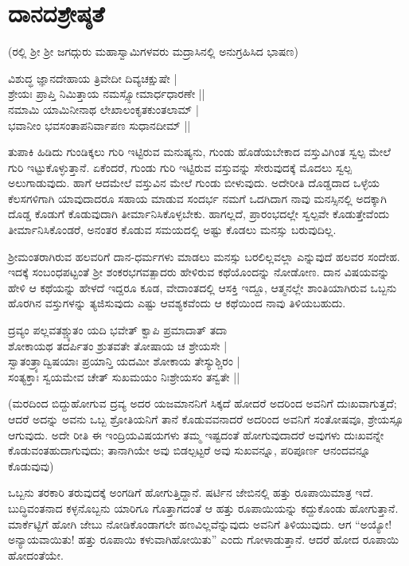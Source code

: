 \chapter{ದಾನದಶ್ರೇಷ್ಠತೆ}\label{chap14}

({}ರಲ್ಲಿ ಶ್ರೀ ಶ್ರೀ ಜಗದ್ಗುರು ಮಹಾಸ್ವಾಮಿಗಳವರು ಮದ್ರಾಸಿನಲ್ಲಿ ಅನುಗ್ರಹಿಸಿದ ಭಾಷಣ)

\begin{shloka}
ವಿಶುದ್ಧ ಜ್ಞಾನದೇಹಾಯ ತ್ರಿವೇದೀ ದಿವ್ಯಚಕ್ಷುಷೇ |\\
ಶ್ರೇಯಃ ಪ್ರಾಪ್ತಿ ನಿಮಿತ್ತಾಯ ನಮಸ್ಸ್ಸೋಮಾರ್ಧಧಾರಣೇ ||\\
ನಮಾಮಿ ಯಾಮಿನೀನಾಥ ಲೇಖಾಲಂಕೃತಕುಂತಲಾಮ್ |\\
ಭವಾನೀಂ ಭವಸಂತಾಪನಿರ್ವಾಪಣ ಸುಧಾನದೀಮ್ ||
\end{shloka}

ತುಪಾಕಿ ಹಿಡಿದು ಗುಂಡಿಕ್ಕಲು ಗುರಿ ಇಟ್ಟಿರುವ ಮನುಷ್ಯನು, ಗುಂಡು ಹೊಡೆಯಬೇಕಾದ ವಸ್ತುವಿಗಿಂತ ಸ್ವಲ್ಪ ಮೇಲೆ ಗುರಿ ಇಟ್ಟುಕೊಳ್ಳುತ್ತಾನೆ. ಏಕೆಂದರೆ, ಗುಂಡು ಗುರಿ ಇಟ್ಟಿರುವ ವಸ್ತುವನ್ನು ಸೇರುವುದಕ್ಕೆ ಮೊದಲು ಸ್ವಲ್ಪ ಅಲುಗಾಡುವುದು. ಹಾಗೆ ಆದಮೇಲೆ ವಸ್ತುವಿನ ಮೇಲೆ ಗುಂಡು ಬೀಳುವುದು. ಅದೇರೀತಿ ದೊಡ್ಡದಾದ ಒಳ್ಳೆಯ ಕೆಲಸಗಳಿಗಾಗಿ ಯಾವುದಾದರೂ ಸಹಾಯ ಮಾಡುವ ಸಂದರ್ಭ ನಮಗೆ ಒದಗಿದಾಗ ನಾವು ಮನಸ್ಸಿನಲ್ಲಿ ಅದಕ್ಕಾಗಿ ದೊಡ್ಡ ಕೊಡುಗೆ ಕೊಡುವುದಾಗಿ ತೀರ್ಮಾನಿಸಿಕೊಳ್ಳಬೇಕು. ಹಾಗಲ್ಲದೆ, ಪ್ರಾರಂಭದಲ್ಲೇ ಸ್ವಲ್ಪವೇ ಕೊಡುತ್ತೇವೆಂದು ತೀರ್ಮಾನಿಸಿಕೊಂಡರೆ, ಅನಂತರ ಕೊಡುವ ಸಮಯದಲ್ಲಿ ಅಷ್ಟು ಕೊಡಲು ಮನಸ್ಸು ಬರುವುದಿಲ್ಲ.

ಶ್ರೀಮಂತರಾಗಿರುವ ಹಲವರಿಗೆ ದಾನ-ಧರ್ಮಗಳು ಮಾಡಲು ಮನಸ್ಸು ಬರಲಿಲ್ಲವಲ್ಲಾ ಎನ್ನುವುದೆ ಹಲವರ ಸಂದೇಹ. ಇದಕ್ಕೆ ಸಂಬಂಧಪಟ್ಟಂತೆ ಶ್ರೀ ಶಂಕರಭಗವತ್ಪಾದರು ಹೇಳಿರುವ ಕಥೆಯೊಂದನ್ನು ನೋಡೋಣ. ದಾನ ವಿಷಯವನ್ನು ಹೇಳಿ ಆ ಕಥೆಯನ್ನು ಹೇಳದೆ ಇದ್ದರೂ ಕೂಡ, ವೇದಾಂತದಲ್ಲಿ ಆಸಕ್ತಿ ಇದ್ದೂ, ಆತ್ಮನಲ್ಲೇ ಶಾಂತಿಯಾಗಿರುವ ಒಬ್ಬನು ಹೊರಗಿನ ವಸ್ತುಗಳನ್ನು ತ್ಯಜಿಸುವುದು ಎಷ್ಟು ಆವಶ್ಯಕವೆಂದು ಆ ಕಥೆಯಿಂದ ನಾವು ತಿಳಿಯಬಹುದು.

\begin{shloka}
ದ್ರವ್ಯಂ ಪಲ್ಲವತಶ್ಚ್ಯುತಂ ಯದಿ ಭವೇತ್ ಕ್ವಾಪಿ ಪ್ರಮಾದಾತ್ ತದಾ\\
ಶೋಕಾಯಥ ತದರ್ಪಿತಂ ಶ್ರುತವತೇ ತೋಷಾಯ ಚ ಶ್ರೇಯಸೇ |\\
ಸ್ವಾತಂತ್ರ್ಯಾದ್ವಿಷಯಾಃ ಪ್ರಯಾನ್ತಿ ಯದಮೀ ಶೋಕಾಯ ತೇಸ್ಯುಶ್ಚಿರಂ |\\
ಸಂತ್ಯಕ್ತಾಃ ಸ್ವಯಮೇವ ಚೇತ್ ಸುಖಮಯಂ ನಿಃಶ್ರೇಯಸಂ ತನ್ವತೇ ||
\end{shloka}

(ಮರದಿಂದ ಬಿದ್ದುಹೋಗುವ ದ್ರವ್ಯ ಅದರ ಯಜಮಾನನಿಗೆ ಸಿಕ್ಕದೆ ಹೋದರೆ ಅದರಿಂದ ಅವನಿಗೆ ದುಃಖವಾಗುತ್ತದೆ; ಆದರೆ ಅದನ್ನು ಅವನು ಒಬ್ಬ ಶ್ರೋತಿಯನಿಗೆ ತಾನೆ ಕೊಡುವವನಾದರೆ ಅದರಿಂದ ಅವನಿಗೆ ಸಂತೋಷವೂ, ಶ್ರೇಯಸ್ಸೂ ಆಗುವುದು. ಅದೇ ರೀತಿ ಈ ಇಂದ್ರಿಯವಿಷಯಗಳು ತಮ್ಮ ಇಷ್ಟದಂತೆ ಹೋಗುವುದಾದರೆ ಅವುಗಳು ದುಃಖವನ್ನೇ ಕೊಡುವಂತಹುದಾಗುವುದು; ತಾನಾಗಿಯೇ ಅವು ಬಿಡಲ್ಪಟ್ಟರೆ ಅವು ಸುಖವನ್ನೂ, ಪರಿಪೂರ್ಣ ಆನಂದವನ್ನೂ ಕೊಡುವುವು)

ಒಬ್ಬನು ತರಕಾರಿ ತರುವುದಕ್ಕೆ ಅಂಗಡಿಗೆ ಹೋಗುತ್ತಿದ್ದಾನೆ. ಷರ್ಟಿನ ಜೇಬಿನಲ್ಲಿ ಹತ್ತು ರೂಪಾಯಿಮಾತ್ರ ಇದೆ. ಬುದ್ಧಿವಂತನಾದ ಕಳ್ಳನೊಬ್ಬನು ಯಾರಿಗೂ ಗೊತ್ತಾಗದಂತೆ ಆ ಹತ್ತು ರೂಪಾಯಿಯನ್ನು ಕದ್ದುಕೊಂಡು ಹೋಗುತ್ತಾನೆ. ಮಾರ್ಕೆಟ್ಟಿಗೆ ಹೋಗಿ ಜೇಬು ನೋಡಿಕೊಂಡಾಗಲೇ ಹಣವಿಲ್ಲವೆನ್ನುವುದು ಅವನಿಗೆ ತಿಳಿಯುವುದು. ಆಗ ``ಅಯ್ಯೋ! ಅನ್ಯಾಯವಾಯಿತು! ಹತ್ತು ರೂಪಾಯಿ ಕಳುವಾಗಿಹೋಯಿತು'' ಎಂದು ಗೋಳಾಡುತ್ತಾನೆ. ಆದರೆ ಹೋದ ರೂಪಾಯಿ ಹೋದಂತೆಯೇ.


